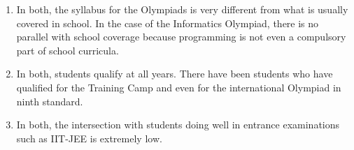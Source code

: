 \documentclass[a4paper]{amsart}
\begin{document}
\begin{enumerate}

\item In both, the syllabus for the Olympiads is very different from
  what is usually covered in school. In the case of the Informatics
  Olympiad, there is no parallel with school coverage because
  programming is not even a compulsory part of school curricula.

\item In both, students qualify at all years. There have been students
  who have qualified for the Training Camp and even for the international
  Olympiad in ninth standard.

\item In both, the intersection with students doing well in entrance
  examinations such as IIT-JEE is extremely low. 

\end{enumerate}





\printindex
\end{document}
